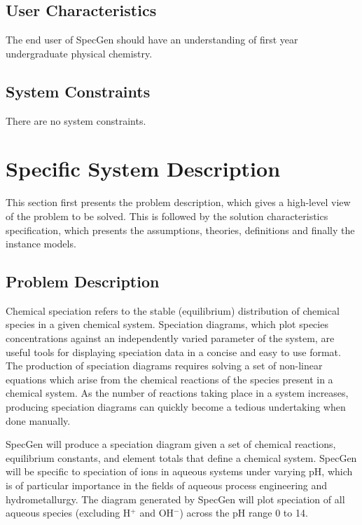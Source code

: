 \documentclass[12pt]{article}
\newcommand{\progname}{SpecGen} %
\begin{document}
\subsection{User Characteristics} \label{SecUserCharacteristics}
The end user of \progname{} should have an understanding of first year 
undergraduate physical chemistry.

\subsection{System Constraints}
There are no system constraints.

\section{Specific System Description}

This section first presents the problem description, which gives a high-level
view of the problem to be solved.  This is followed by the solution 
characteristics specification, which presents the assumptions, theories, 
definitions and finally the instance models.

\subsection{Problem Description} \label{Sec_pd}
Chemical speciation refers to the stable (equilibrium) distribution of chemical 
species in a given chemical system. Speciation diagrams, which plot species 
concentrations against an independently varied parameter of the system, are 
useful tools for displaying speciation data in a concise and easy to use format. 
The production of speciation diagrams requires solving a set of non-linear 
equations which arise from the chemical reactions of the species present in a 
chemical system.  As the number of reactions taking place in a system increases, 
producing speciation diagrams can quickly become a tedious undertaking when done 
manually.

\progname{} will produce a speciation diagram given a set of chemical reactions, 
equilibrium constants, and element totals that define a chemical system. 
\progname{} will be specific to speciation of ions in aqueous systems under 
varying pH, which is of particular importance in the fields of aqueous process 
engineering and hydrometallurgy.  The diagram generated by \progname{} will 
plot speciation of all aqueous species (excluding H$^+$ and OH$^-$) across the 
pH range 0 to 14.
\end{document}
